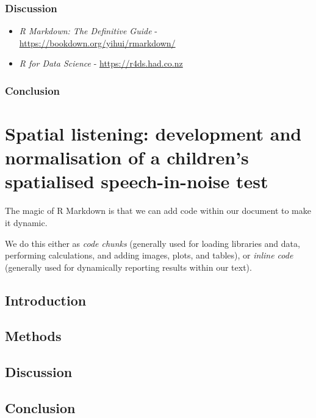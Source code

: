 \documentclass[a4paper, twoside]{templates/ociamthesis}
\begin{document}
\hypertarget{discussion-2}{%
\subsection{Discussion}\label{discussion-2}}

\begin{itemize}
\item
  \emph{R Markdown: The Definitive Guide} - \url{https://bookdown.org/yihui/rmarkdown/}
\item
  \emph{R for Data Science} - \url{https://r4ds.had.co.nz}
\end{itemize}

\hypertarget{conclusion}{%
\subsection{Conclusion}\label{conclusion}}

\hypertarget{Chpt2}{%
\chapter{Spatial listening: development and normalisation of a children's spatialised speech-in-noise test}\label{Chpt2}}

\minitoc 

The magic of R Markdown is that we can add code within our document to make it dynamic.

We do this either as \emph{code chunks} (generally used for loading libraries and data, performing calculations, and adding images, plots, and tables), or \emph{inline code} (generally used for dynamically reporting results within our text).

\hypertarget{introduction-3}{%
\section{Introduction}\label{introduction-3}}

\hypertarget{methods-3}{%
\section{Methods}\label{methods-3}}

\hypertarget{discussion-3}{%
\section{Discussion}\label{discussion-3}}

\hypertarget{conclusion-1}{%
\section{Conclusion}\label{conclusion-1}}
\end{document}
